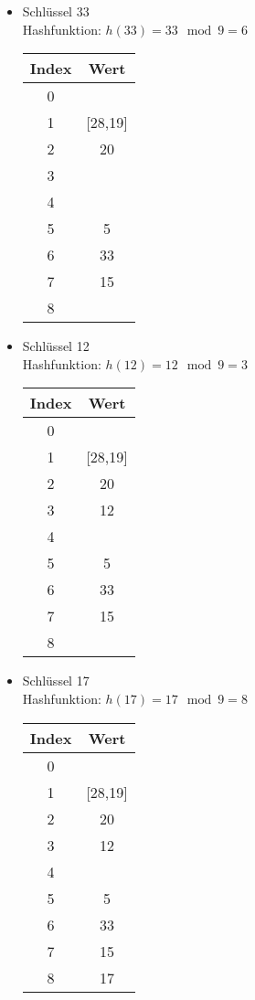 \begin{multicols}{2}
\begin{itemize}
\item Schlüssel 33\\
Hashfunktion: $h(33) = 33 \mod 9 = 6$

\begin{center}
\begin{tabular}{c|c}
Index & Wert \\
\hline
0 & \\
1 & [28,19]\\
2 & 20\\
3 & \\
4 & \\
5 & 5\\
6 & 33\\
7 & 15\\
8 & \\
\end{tabular}
\end{center}

\item Schlüssel 12\\
Hashfunktion: $h(12) = 12 \mod 9 = 3$

\begin{center}
\begin{tabular}{c|c}
Index & Wert \\
\hline
0 & \\
1 & [28,19]\\
2 & 20\\
3 & 12\\
4 & \\
5 & 5\\
6 & 33\\
7 & 15\\
8 & \\
\end{tabular}
\end{center}

\item Schlüssel 17\\
Hashfunktion: $h(17) = 17 \mod 9 = 8$

\begin{center}
\begin{tabular}{c|c}
Index & Wert \\
\hline
0 & \\
1 & [28,19]\\
2 & 20\\
3 & 12\\
4 & \\
5 & 5\\
6 & 33\\
7 & 15\\
8 & 17\\
\end{tabular}
\end{center}


\end{itemize}
\end{multicols}
